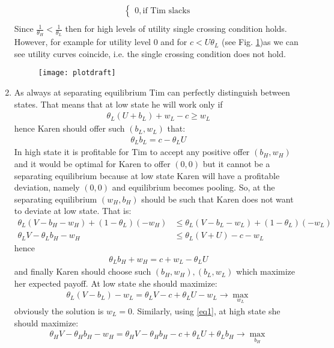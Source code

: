 \documentclass[a4paper]{article}
\begin{document}
\begin{enumerate}
\begin{align*}
\begin{cases}
	0, \text{if Tim slacks}
	\end{cases}\\
	\end{align*}
	Since $\frac{1}{\theta_H} < \frac{1}{\theta_L}$ then for high levels of utility single crossing condition holds. However, for example for utility level $0$ and for $c < U \theta_L$ (see Fig. \ref{fig9})as we can see utility curves coincide, i.e. the single crossing condition does not hold.
	\begin{figure}[H]
		\centering
		\texttt{[image: plotdraft]}
		\caption{}\label{fig9}
	\end{figure}
	\item  As always at separating equilibrium Tim can perfectly distinguish between states. That means that at low state he will work only if
	\begin{align*}
	\theta_L(U + b_L) + w_L - c \ge w_L
	\end{align*}
	hence Karen should offer such $(b_L, w_L)$ that:
	\begin{align*}
	\theta_L b_L = c - \theta_LU
	\end{align*}
	In high state it is profitable for Tim to accept any positive offer $(b_H, w_H)$ and it would be optimal for Karen to offer $(0, 0)$ but it cannot be a separating equilibrium because at low state Karen will have a profitable deviation, namely $(0, 0)$ and equilibrium becomes pooling. So, at the separating equilibrium $(w_H, b_H)$ should be such that Karen does not want to deviate at low state. That is:
	\begin{align*}
	\theta_L(V - b_H - w_H) + (1 - \theta_L)(-w_H) &\le \theta_L(V - b_L - w_L) + (1 - \theta_L)(-w_L)\\
	\theta_L V - \theta_Lb_H - w_H &\le \theta_L(V + U) - c - w_L
	\end{align*}
	hence
	\begin{align}\label{eq1}
	\theta_L b_H + w_H = c +w_L - \theta_L U
	\end{align}
	and finally Karen should choose such $(b_H, w_H), (b_L, w_L)$ which maximize her expected payoff. At low state she should maximize:
	\begin{align*}
	\theta_L (V - b_L) - w_L = \theta_L V - c + \theta_LU - w_L \to \underset{w_L}{\max}
	\end{align*}
	obviously the solution is $w_L = 0$. Similarly, using \eqref{eq1}, at high state she should maximize:
	\begin{align*}
	\theta_HV - \theta_H b_H - w_H = \theta_HV - \theta_Hb_H - c + \theta_LU + \theta_L b_H \to \underset{b_H}{\max}\\

\end{align*}
\end{enumerate}
\end{document}
